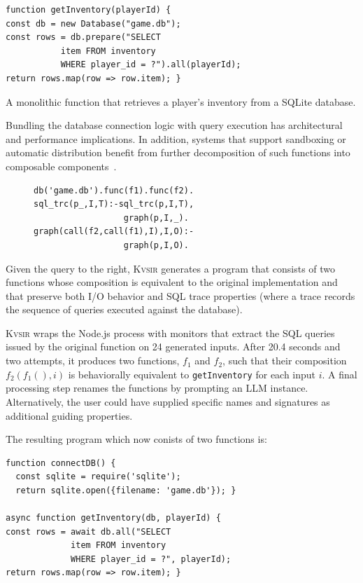 \documentclass[sigplan,review,anonymous,10pt]{acmart}
\newcommand{\sys}{{\scshape Kv{\textalpha}sir}\xspace}
\begin{document}
\begin{listing}
\begin{verbatim}
function getInventory(playerId) {
const db = new Database("game.db");
const rows = db.prepare("SELECT
           item FROM inventory
           WHERE player_id = ?").all(playerId);
return rows.map(row => row.item); }
\end{verbatim}
\caption{A monolithic function that retrieves a player's inventory from a SQLite database.}
\label{listing:monolithic-sql}
\end{listing}

Bundling the database connection logic with query execution has architectural
and performance implications. In addition, systems that support sandboxing or
automatic distribution benefit from further decomposition of such functions
into composable components~\cite{Towards_Modern_Ghemaw_2023, vasilakis2019ignis, vasilakis2018breakapp}.

\begin{figure}
  \begin{verbatim}
db('game.db').func(f1).func(f2).
sql_trc(p_,I,T):-sql_trc(p,I,T),
                  graph(p,I,_).
graph(call(f2,call(f1),I),I,O):-
                  graph(p,I,O).
  \end{verbatim}
\end{figure}

Given the query to the right, \sys generates a program that consists of two
functions whose composition is equivalent to the original implementation and
that preserve both I/O behavior and SQL trace properties (where a trace records
the sequence of queries executed against the database).

\sys wraps the Node.js process with monitors that extract the SQL queries
issued by the original function on 24 generated inputs.
After 20.4 seconds and
two attempts, it produces two functions, $f_1$ and $f_2$, such that their
composition $f_2(f_1(), i)$ is behaviorally equivalent to \texttt{getInventory}
for each input $i$.
A final processing step renames the functions by prompting
an LLM instance.
Alternatively, the user could have supplied specific names and
signatures as additional guiding properties.

The resulting program which now conists of two functions is:
\begin{verbatim}
function connectDB() {
  const sqlite = require('sqlite');
  return sqlite.open({filename: 'game.db'}); }

async function getInventory(db, playerId) {
const rows = await db.all("SELECT 
             item FROM inventory
             WHERE player_id = ?", playerId);
return rows.map(row => row.item); }
\end{verbatim}
\end{document}
